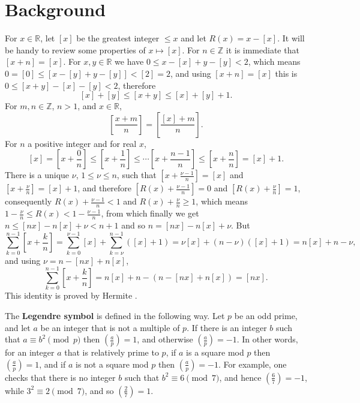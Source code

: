 \documentclass{article}
\begin{document}
\section{Background}
\label{background}
For $x \in \mathbb{R}$, let $[ x ]$ be the greatest integer $\leq x$ and let $R(x)=x-[x]$.
It will be handy to review some properties of $x \mapsto [x]$.
For $n \in \mathbb{Z}$ it is immediate that $[x+n]=[x]$. 
For $x,y \in \mathbb{R}$ we have
$0 \leq x-[x] + y - [y] < 2$, which means
$0 = [0] \leq [x-[y]+y-[y]] < [2] = 2$, and using $[x+n]=[x]$ this is $0 \leq [x+y]-[x]-[y] < 2$, therefore
\[
[x] + [y] \leq [x+y] \leq [x]+[y]+1.
\]
For $m,n \in \mathbb{Z}$, $n>1$, and $x \in \mathbb{R}$,
\[
\left[ \frac{x+m}{n} \right] = \left[ \frac{[x]+m}{n} \right].
\]
For $n$ a positive integer and for real $x$,
\[
[x]=\left[x+\frac{0}{n}\right] \leq \left[x+\frac{1}{n}\right] \leq \cdots \left[x+\frac{n-1}{n} \right] \leq \left[x+\frac{n}{n} \right]
=[x]+1.
\]
There is a unique $\nu$, $1 \leq \nu \leq n$, such that $\left[x+\frac{\nu-1}{n} \right]= [x]$ and
$\left[x+\frac{\nu}{n} \right] = [x]+1$, 
and therefore $\left[R(x) + \frac{\nu-1}{n} \right] = 0$ and 
$\left[ R(x) + \frac{\nu}{n} \right]=1$, consequently
$R(x)+\frac{\nu-1}{n}<1$ and $R(x)+\frac{\nu}{n} \geq 1$, which means
$1-\frac{\nu}{n} \leq R(x) < 1-\frac{\nu-1}{n}$, from which finally we get
$n \leq [nx]-n[x]+\nu<n+1$ and so $n=[nx]-n[x]+\nu$.
But
\[
\sum_{k=0}^{n-1} \left[x+\frac{k}{n} \right] = \sum_{k=0}^{\nu-1} [x] + \sum_{k=\nu}^{n-1} ([x]+1)
=\nu [x] + (n-\nu)([x]+1)
=n[x]+n-\nu,
\]
and using $\nu=n-[nx]+n[x]$,
\[
\sum_{k=0}^{n-1} \left[x+\frac{k}{n} \right]  = n[x]+n-(n-[nx]+n[x]) = [nx].
\] 
This identity is proved by Hermite \cite[pp.~310--315, \S V]{hermite}.







The \textbf{Legendre symbol} is defined in the following way. Let $p$ be an odd prime, and let $a$ be an integer that is not a multiple of $p$.
If there is an integer $b$ such that $a \equiv b^2 \pmod{p}$ then
$\left( \frac{a}{p} \right)=1$, and otherwise $\left( \frac{a}{p} \right)=-1$. In other words, for an integer $a$ that is relatively prime to $p$, if $a$ is a square mod $p$ then
$\left( \frac{a}{p} \right)=1$, and if $a$ is not a square mod $p$ then $\left( \frac{a}{p} \right)=-1$. For example, one checks that there is no integer $b$ such that
$b^2 \equiv 6 \pmod{7}$, and hence $\left( \frac{6}{7} \right)=-1$, while $3^2 \equiv 2 \pmod{7}$, and so $\left( \frac{2}{7} \right)=1$.
\end{document}
